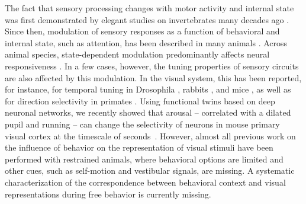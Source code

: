 \documentclass[B2,COG]{ercgrant}
\begin{document}
The fact that sensory processing changes with motor activity and internal state was first demonstrated by elegant studies on invertebrates many decades ago  \parencite{Rowell1971-zj, Wiersma1968-xt}.
Since then, modulation of sensory responses as a function of behavioral and internal state, such as attention, has been described in many animals \parencite[\eg][]{Maimon2010-sa, Niell2010-bs,Bezdudnaya2006-ge, Treue1996-lp, Musall2019-kd}.
Across animal species, state-dependent modulation predominantly affects neural responsiveness \parencite{Eggermann2014-xp, Niell2010-bs, McAdams1999-cs,Schroder2020-jl, Dadarlat2017-jw, Mineault2016-fk}.
In a few cases, however, the tuning properties of sensory circuits are also affected by this modulation. 
In the visual system, this has been reported, for instance, for temporal tuning in Drosophila \parencite{Chiappe2010-bm}, rabbits \parencite{Bezdudnaya2006-ge}, and mice \parencite{Andermann2011-vw}, as well as for direction selectivity in primates \parencite{Treue1996-lp}.
Using functional twins based on deep neuronal networks, we recently showed that arousal -- correlated with a dilated pupil and running -- can change the selectivity of neurons in mouse primary visual cortex at the timescale of seconds~\parencite{Franke2022-do}. 
However, almost all previous work on the influence of behavior on the representation of visual stimuli have been performed with restrained animals, where behavioral options are limited and other cues, such as self-motion and vestibular signals, are missing.
A systematic characterization of the correspondence between behavioral context and visual representations during free behavior is currently missing. 
\end{document}
